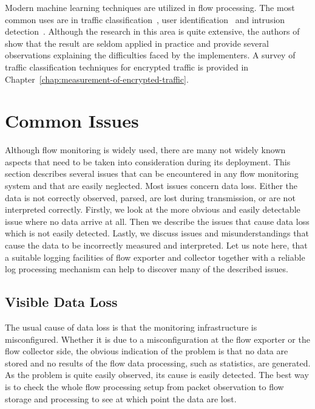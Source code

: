 Modern machine learning techniques are utilized in flow processing. The most common uses are in traffic classification~\cite{Velan-2015-Survey}, user identification~\cite{Verde-2014-No} and intrusion detection~\cite{Tsai-2009-Intrusion}. Although the research in this area is quite extensive, the authors of~\cite{Sommer-2010-Outside} show that the result are seldom applied in practice and provide several observations explaining the difficulties faced by the implementers. A survey of traffic classification techniques for encrypted traffic is provided in Chapter~\ref{chap:measurement-of-encrypted-traffic}.


\section{Common Issues}

Although flow monitoring is widely used, there are many not widely known aspects that need to be taken into consideration during its deployment. This section describes several issues that can be encountered in any flow monitoring system and that are easily neglected. Most issues concern data loss. Either the data is not correctly observed, parsed, are lost during transmission, or are not interpreted correctly. Firstly, we look at the more obvious and easily detectable issue where no data arrive at all. Then we describe the issues that cause data loss which is not easily detected. Lastly, we discuss issues and misunderstandings that cause the data to be incorrectly measured and interpreted. Let us note here, that a suitable logging facilities of flow exporter and collector together with a reliable log processing mechanism can help to discover many of the described issues.

\subsection{Visible Data Loss}

The usual cause of data loss is that the monitoring infrastructure is misconfigured. Whether it is due to a misconfiguration at the flow exporter or the flow collector side, the obvious indication of the problem is that no data are stored and no results of the flow data processing, such as statistics, are generated. As the problem is quite easily observed, its cause is easily detected. The best way is to check the whole flow processing setup from packet observation to flow storage and processing to see at which point the data are lost.

